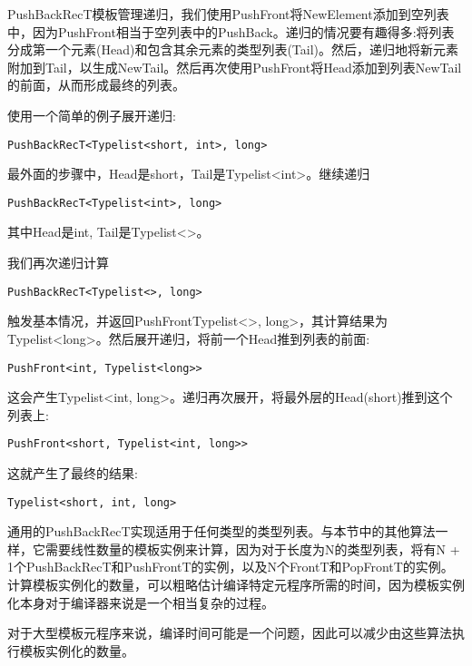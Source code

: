 PushBackRecT模板管理递归，我们使用PushFront将NewElement添加到空列表中，因为PushFront相当于空列表中的PushBack。递归的情况要有趣得多:将列表分成第一个元素(Head)和包含其余元素的类型列表(Tail)。然后，递归地将新元素附加到Tail，以生成NewTail。然后再次使用PushFront将Head添加到列表NewTail的前面，从而形成最终的列表。

使用一个简单的例子展开递归:

\begin{lstlisting}[style=styleCXX]
PushBackRecT<Typelist<short, int>, long>
\end{lstlisting}

最外面的步骤中，Head是short，Tail是Typelist<int>。继续递归

\begin{lstlisting}[style=styleCXX]
PushBackRecT<Typelist<int>, long>
\end{lstlisting}

其中Head是int, Tail是Typelist<>。

我们再次递归计算

\begin{lstlisting}[style=styleCXX]
PushBackRecT<Typelist<>, long>
\end{lstlisting}

触发基本情况，并返回PushFrontTypelist<>, long>，其计算结果为Typelist<long>。然后展开递归，将前一个Head推到列表的前面:

\begin{lstlisting}[style=styleCXX]
PushFront<int, Typelist<long>>
\end{lstlisting}

这会产生Typelist<int, long>。递归再次展开，将最外层的Head(short)推到这个列表上:

\begin{lstlisting}[style=styleCXX]
PushFront<short, Typelist<int, long>>
\end{lstlisting}

这就产生了最终的结果:

\begin{lstlisting}[style=styleCXX]
Typelist<short, int, long>
\end{lstlisting}

通用的PushBackRecT实现适用于任何类型的类型列表。与本节中的其他算法一样，它需要线性数量的模板实例来计算，因为对于长度为N的类型列表，将有N + 1个PushBackRecT和PushFrontT的实例，以及N个FrontT和PopFrontT的实例。计算模板实例化的数量，可以粗略估计编译特定元程序所需的时间，因为模板实例化本身对于编译器来说是一个相当复杂的过程。

对于大型模板元程序来说，编译时间可能是一个问题，因此可以减少由这些算法执行模板实例化的数量。

